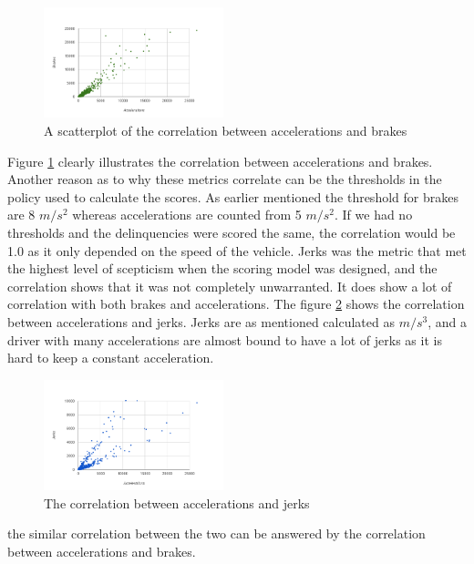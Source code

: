 \begin{figure}[tb]
\centering
\includegraphics[width=0.465\textwidth]{Pictures/abcorrel}
\caption{A scatterplot of the correlation between accelerations and brakes}
\label{fig:abcorrel}
\end{figure}

Figure \ref{fig:abcorrel} clearly illustrates the correlation between accelerations and brakes. Another reason as to why these metrics correlate can be the thresholds in the policy used to calculate the scores. As earlier mentioned the threshold for brakes are 8 $m/s^2$ whereas accelerations are counted from 5 $m/s^2$. If we had no thresholds and the delinquencies were scored the same, the correlation would be 1.0 as it only depended on the speed of the vehicle. 
Jerks was the metric that met the highest level of scepticism when the scoring model was designed, and the correlation shows that it was not completely unwarranted. It does show a lot of correlation with both brakes and accelerations. The figure \ref{fig:ajcorrel} shows the correlation between accelerations and jerks. Jerks are as mentioned calculated as $m/s^3$, and a driver with many accelerations are almost bound to have a lot of jerks as it is hard to keep a constant acceleration.

\begin{figure}[tb]
\centering
\includegraphics[width=0.465\textwidth]{Pictures/ajcorrel}
\caption{The correlation between accelerations and jerks}
\label{fig:ajcorrel}
\end{figure}


the similar correlation between the two can be answered by the correlation between accelerations and brakes. 

